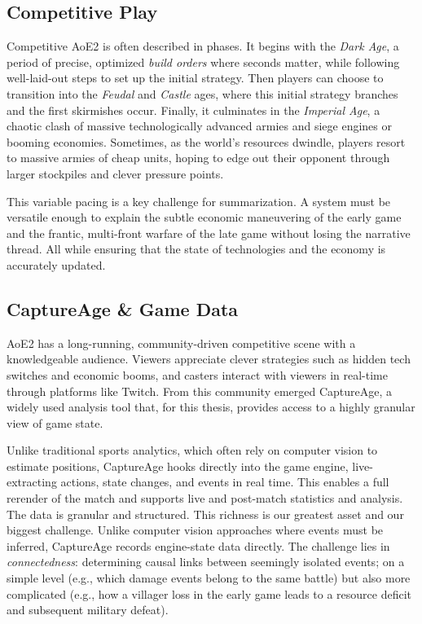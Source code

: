 \subsection{Competitive Play}
Competitive AoE2 is often described in phases. It begins with the \textit{Dark Age}, a period of precise, optimized \textit{build orders} where seconds matter, while following well-laid-out steps to set up the initial strategy. Then players can choose to transition into the \textit{Feudal} and \textit{Castle} ages, where this initial strategy branches and the first skirmishes occur. Finally, it culminates in the \textit{Imperial Age}, a chaotic clash of massive technologically advanced armies and siege engines or booming economies. Sometimes, as the world's resources dwindle, players resort to massive armies of cheap units, hoping to edge out their opponent through larger stockpiles and clever pressure points.

This variable pacing is a key challenge for summarization. A system must be versatile enough to explain the subtle economic maneuvering of the early game and the frantic, multi-front warfare of the late game without losing the narrative thread. All while ensuring that the state of technologies and the economy is accurately updated.

\subsection{CaptureAge \& Game Data}
AoE2 has a long-running, community-driven competitive scene with a knowledgeable audience. Viewers appreciate clever strategies such as hidden tech switches and economic booms, and casters interact with viewers in real-time through platforms like Twitch. From this community emerged CaptureAge, a widely used analysis tool that, for this thesis, provides access to a highly granular view of game state.

Unlike traditional sports analytics, which often rely on computer vision to estimate positions, CaptureAge hooks directly into the game engine, live-extracting actions, state changes, and events in real time. This enables a full rerender of the match and supports live and post-match statistics and analysis. The data is granular and structured.
This richness is our greatest asset and our biggest challenge. Unlike computer vision approaches where events must be inferred, CaptureAge records engine-state data directly. The challenge lies in \textit{connectedness}: determining causal links between seemingly isolated events; on a simple level (e.g., which damage events belong to the same battle) but also more complicated (e.g., how a villager loss in the early game leads to a resource deficit and subsequent military defeat).

